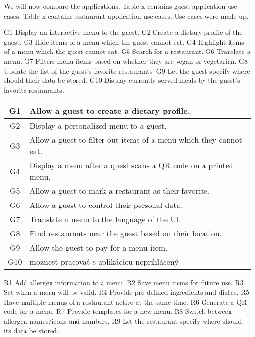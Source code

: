 We will now compare the applications.
Table x contains guest application use cases.
Table x contains restaurant application use cases.
Use cases were made up.

G1 Display an interactive menu to the guest.
G2 Create a dietary profile of the guest.
G3 Hide items of a menu which the guest cannot eat.
G4 Highlight items of a menu which the guest cannot eat.
G5 Search for a restaurant.
G6 Translate a menu.
G7 Filters menu items based on whether they are vegan or vegetarian.
G8 Update the list of the guest's favorite restaurants.
G9 Let the guest specify where should their data be stored.
G10 Display currently served meals by the guest's favorite restaurants.

\begin{center}
  \begin{tabular}{| c | l |}
    \hline
    G1 & Allow a guest to create a dietary profile. \\
    \hline
    G2 & Display a personalized menu to a guest. \\
    \hline
    G3 & Allow a guest to filter out items of a menu which they cannot eat. \\
    \hline
    G4 & Display a menu after a quest scans a QR code on a printed menu. \\
    \hline
    G5 & Allow a guest to mark a restaurant as their favorite. \\
    \hline
    G6 & Allow a guest to control their personal data. \\
    \hline
    G7 & Translate a menu to the language of the UI. \\
    \hline
    G8 & Find restaurants near the guest based on their location. \\
    \hline
    G9 & Allow the guest to pay for a menu item. \\ %
    \hline
    G10 & možnosť pracovať s aplikáciou neprihlásený \\
    \hline
  \end{tabular}
  \newline
\end{center}

R1 Add allergen information to a menu.
R2 Save menu items for future use.
R3 Set when a menu will be valid. 
R4 Provide pre-defined ingredients and dishes.
R5 Have multiple menus of a restaurant active at the same time.
R6 Generate a QR code for a menu.
R7 Provide templates for a new menu. 
R8 Switch between allergen names/icons and numbers.
R9 Let the restaurant specify where should its data be stored.

